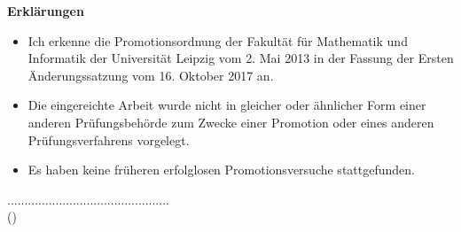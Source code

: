 \newpage
\begin{center}{\Large \bf Erkl\"arungen }\end{center}

\begin{itemize}
\item Ich erkenne die Promotionsordnung der Fakult\"at f\"ur Mathematik und Informatik der Universit\"at Leipzig vom 2. Mai 2013 in der Fassung der Ersten \"Anderungssatzung vom 16. Oktober 2017 an. \vspace{0.2cm}

\item Die eingereichte Arbeit wurde nicht in gleicher oder \"ahnlicher Form einer anderen Pr\"ufungsbeh\"orde zum Zwecke einer Promotion oder eines anderen Pr\"ufungsverfahrens vorgelegt. \vspace{0.2cm}

\item Es haben keine fr\"uheren erfolglosen Promotionsversuche stattgefunden. 
\vspace{0.2cm}

\end{itemize}

\vspace*{1.5cm}
\begin{flushleft}
...............................................\\
(\me)
\end{flushleft}

